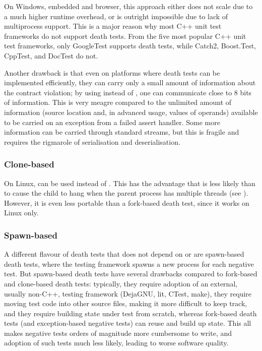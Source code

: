 On Windows, embedded and browser, this approach either does not scale due to a much higher runtime overhead, or is outright impossible due to lack of multiprocess support. This is a major reason why most C++ unit test frameworks do not support death tests. From the five most popular C++ unit test frameworks, only GoogleTest supports death tests, while Catch2, Boost.Test, CppTest, and DocTest do not.

Another drawback is that even on platforms where death tests can be implemented efficiently, they can carry only a small amount of information about the contract violation; by using  instead of , one can communicate close to 8 bits of information. This is very meagre compared to the unlimited amount of information (source location and, in advanced usage, values of operands) available to be carried on an exception from a failed assert handler. Some more information can be carried through standard streams, but this is fragile and requires the rigmarole of serialisation and deserialisation.

\subsubsection{Clone-based}

On Linux,  can be used instead of . This has the advantage that  is less likely than  to cause the child to hang when the parent process has multiple threads (see \cite{GTestDocDeathTests}). However, it is even less portable than a fork-based death test, since it works on Linux only.

\subsubsection{Spawn-based}

A different flavour of death tests that does not depend on  or  are spawn-based death tests, where the testing framework spawns a new process for each negative test. But spawn-based death tests have several drawbacks compared to fork-based and clone-based death tests: typically, they require adoption of an external, usually non-C++, testing framework (DejaGNU, lit, CTest, make), they require moving test code into other source files, making it more difficult to keep track, and they require building state under test from scratch, whereas fork-based death tests (and exception-based negative tests) can reuse and build up state. This all makes negative tests orders of magnitude more cumbersome to write, and adoption of such tests much less likely, leading to worse software quality.

